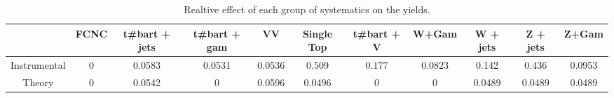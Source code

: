 \begin{table}[htbp]
\begin{center}
\begin{tabular}{|c|c|c|c|c|c|c|c|c|c|c|}
\hline 
      & FCNC      & t#bar{t} + jets      & t#bar{t} +  gam      & VV      & Single Top      & t#bar{t} + V      & W+Gam      & W + jets      & Z + jets      & Z+Gam \\ 
\hline 
 Instrumental & 0 & 0.0583 & 0.0531 & 0.0536 & 0.509 & 0.177 & 0.0823 & 0.142 & 0.436 & 0.0953 \\ 
 Theory & 0 & 0.0542 & 0 & 0.0596 & 0.0496 & 0 & 0 & 0.0489 & 0.0489 & 0.0489 \\ 
\hline 
\end{tabular} 
\caption{Realtive effect of each group of systematics on the yields.} 
\end{center} 
\end{table} 
